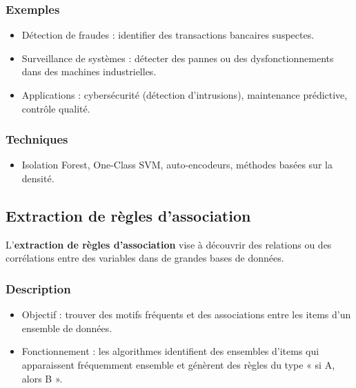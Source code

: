 \documentclass[a4paper,12pt]{report}
\begin{document}
        \subsubsection*{Exemples}
        
        \begin{itemize}
            \item  Détection de fraudes : identifier des transactions bancaires suspectes.
            \item  Surveillance de systèmes : détecter des pannes ou des dysfonctionnements dans des machines industrielles.
            \item  Applications : cybersécurité (détection d’intrusions), maintenance prédictive, contrôle qualité.
        \end{itemize}
        
        \subsubsection*{Techniques}
        
        \begin{itemize}
            \item Isolation Forest, One-Class SVM, auto-encodeurs, méthodes basées sur la densité.
        \end{itemize}
        
        \subsection{Extraction de règles d’association}
        
        L’\textbf{extraction de règles d’association} vise à découvrir des relations ou des corrélations entre des variables dans de grandes bases de données.
        
        \subsubsection*{Description}
        
        \begin{itemize}
            \item  Objectif : trouver des motifs fréquents et des associations entre les items d’un ensemble de données.
            \item  Fonctionnement : les algorithmes identifient des ensembles d’items qui apparaissent fréquemment ensemble et génèrent des règles du type « si A, alors B ».
        \end{itemize}
        
\end{document}
